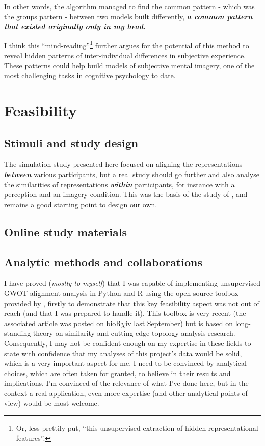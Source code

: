 \documentclass[
  authoryear]{elsarticle}
\begin{document}
In other words, the algorithm managed to find the common pattern - which
was the groups pattern - between two models built differently,
\textbf{\emph{a common pattern that existed originally only in my
head.}}

I think this ``mind-reading''\footnote{Or, less prettily put, ``this
  unsupervised extraction of hidden representational features''.}
further argues for the potential of this method to reveal hidden
patterns of inter-individual differences in subjective experience. These
patterns could help build models of subjective mental imagery, one of
the most challenging tasks in cognitive psychology to date.

\section{Feasibility}\label{feasibility}

\subsection{Stimuli and study design}\label{stimuli-and-study-design}

The simulation study presented here focused on aligning the
representations \textbf{\emph{between}} various participants, but a real
study should go further and also analyse the similarities of
representations \textbf{\emph{within}} participants, for instance with a
perception and an imagery condition. This was the basis of the study of
\citet{shepardSecondorderIsomorphismInternal1970}, and remains a good
starting point to design our own.

\subsection{Online study materials}\label{sec-online-study-materials}

\subsection{Analytic methods and
collaborations}\label{analytic-methods-and-collaborations}

I have proved (\emph{mostly to myself}) that I was capable of
implementing unsupervised GWOT alignment analysis in Python and R using
the open-source toolbox provided by
\citet{sasakiToolboxGromovWassersteinOptimal2023}, firstly to
demonstrate that this key feasibility aspect was not out of reach (and
that I was prepared to handle it). This toolbox is very recent (the
associated article was posted on bioR\(\chi\)iv last September) but is
based on long-standing theory on similarity and cutting-edge topology
analysis research. Consequently, I may not be confident enough on my
expertise in these fields to state with confidence that my analyses of
this project's data would be solid, which is a very important aspect for
me. I need to be convinced by analytical choices, which are often taken
for granted, to believe in their results and implications. I'm convinced
of the relevance of what I've done here, but in the context a real
application, even more expertise (and other analytical points of view)
would be most welcome.
\end{document}
